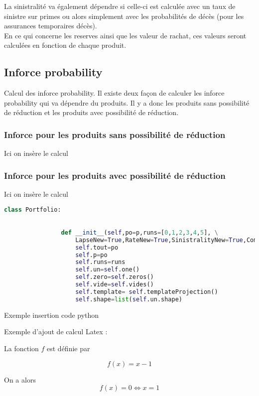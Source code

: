 \documentclass{article}
\begin{document}
La sinistralité va également dépendre si celle-ci est calculée avec un taux de sinistre sur primes ou alors simplement avec les probabilités de décès (pour les assurances temporaires décès).\\

En ce qui concerne les reserves ainsi que les valeur de rachat, ces valeurs seront calculées en fonction de chaque produit.


	\subsection{Inforce probability}
	Calcul des inforce probability. Il existe deux façon de calculer les inforce 				probability qui va dépendre du produits. Il y a donc les produits sans possibilité 			de réduction et les produits avec possibilité de réduction.

		\subsubsection{Inforce pour les produits sans possibilité de réduction}
		Ici on insère le calcul 

		\subsubsection{Inforce pour les produits avec possibilité de réduction}
		Ici on insère le calcul 

			\begin{lstlisting}[language=Python]
			class Portfolio:
    

    			def __init__(self,po=p,runs=[0,1,2,3,4,5], \
                    LapseNew=True,RateNew=True,SinistralityNew=True,CommissionNew=True,CostNew=True):
        			self.tout=po    
        			self.p=po
        			self.runs=runs
        			self.un=self.one()
        			self.zero=self.zeros()
        			self.vide=self.vides()
        			self.template= self.templateProjection()
        			self.shape=list(self.un.shape)

			\end{lstlisting}
			Exemple insertion code python	
			
			Exemple d'ajout de calcul Latex :

La fonction $f$ est définie par

\begin{equation}
  f(x) = x-1
\end{equation}

On a alors
\begin{equation}
   f(x) = 0 \iff x = 1
\end{equation}
		
\end{document}
